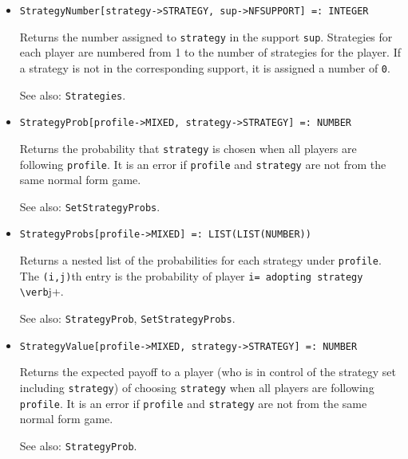 \begin{itemize}
\item{}
\protect \large \begin{verbatim}
StrategyNumber[strategy->STRATEGY, sup->NFSUPPORT] =: INTEGER
\end{verbatim}\normalsize

\bd 
Returns the number assigned to \verb+strategy+ in the support
\verb+sup+.  Strategies  for each player are numbered from 1 to
the number of strategies for the player.  If a strategy is not in
the corresponding support, it is assigned a number of
\verb+0+.
\item [See also:] \verb+Strategies+. 
\ed

\item{}
\protect \large \begin{verbatim}
StrategyProb[profile->MIXED, strategy->STRATEGY] =: NUMBER 
\end{verbatim} \normalsize

\bd
Returns the probability that \verb+strategy+ is chosen when all
players are following \verb+profile+.  It is an error if \verb+profile+
and \verb+strategy+ are not from the same normal form game.
\item [See also:] \verb+SetStrategyProbs+.
\ed

\item{}
\protect \large \begin{verbatim}
StrategyProbs[profile->MIXED] =: LIST(LIST(NUMBER)) 
\end{verbatim} \normalsize

\bd
Returns a nested list of the probabilities for each strategy under
\verb+profile+.  The \verb+(i,j)+th entry is the probability of player
\verb+i= adopting strategy \verb+j+.
\item [See also:] \verb+StrategyProb+, \verb+SetStrategyProbs+.
\ed

\item{}
\protect \large \begin{verbatim}
StrategyValue[profile->MIXED, strategy->STRATEGY] =: NUMBER 
\end{verbatim}\normalsize

\bd 
Returns the expected payoff to a player (who is in control of the
strategy set including \verb+strategy+) of choosing \verb+strategy+ when
all players are following \verb+profile+.  It is an error if
\verb+profile+ and \verb+strategy+ are not from the same normal form
game.
\item [See also:] \verb+StrategyProb+. 
\ed


\end{itemize}
